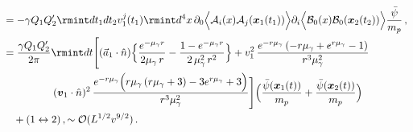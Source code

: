 \begin{itemize}
\begin{align}
   &=-\gamma Q_1Q_2'\rmint dt_1dt_2v_1^j(t_1)\rmint d^4x\,\partial_0\Big{\langle}\mathcal{A}_i(x)\mathcal{A}_j(\boldsymbol{x}_1(t_1))\Big{\rangle}\partial_i\Big{\langle}\mathcal{B}_0(x)\mathcal{B}_0(\boldsymbol{x}_2(t_2))\Big{\rangle}\frac{\Bar{\psi}}{m_p}\,,\notag\\
   &=\frac{\gamma Q_1Q_2'}{2\pi}\rmint dt \Bigg[(\Vec{a}_1\cdot \Hat{n})\Big\{\frac{  e^{-\mu_{\gamma} r}}{2 \mu_{\gamma} \,r}-\frac{1 -  e^{-\mu_{\gamma} r}}{2\, \mu_{\gamma}^2\, r^2}\Big\}+v_1^2 \,\frac{e^{-r \mu _{\gamma }} \left(-r \mu _{\gamma }+e^{r \mu _{\gamma }}-1\right)}{  r^3 \mu _{\gamma }^2}\notag\\
   &
\,\,\,\,\,\,\,\,\,\,\,\,\,\,\,\,\,\,\,\,\,\,\,\,\,\,\,\,\,
(\boldsymbol{v}_1\cdot \Hat{n})^2\,\frac{e^{-r \mu _{\gamma }} \Big(r \mu _{\gamma } \left(r \mu _{\gamma }+3\right)-3 e^{r \mu _{\gamma }}+3\Big)}{  r^3 \mu _{\gamma }^2}
\Bigg]\Big(\frac{\Bar{\psi}(\boldsymbol{x}_1(t))}{m_p}+\frac{\Bar{\psi}(\boldsymbol{x}_2(t))}{m_p}\Big)\notag\\
   &\quad +(1\leftrightarrow 2)\,,\sim\mathcal{O}(L^{1/2}v^{9/2})\,.\end{align}

\end{itemize}
